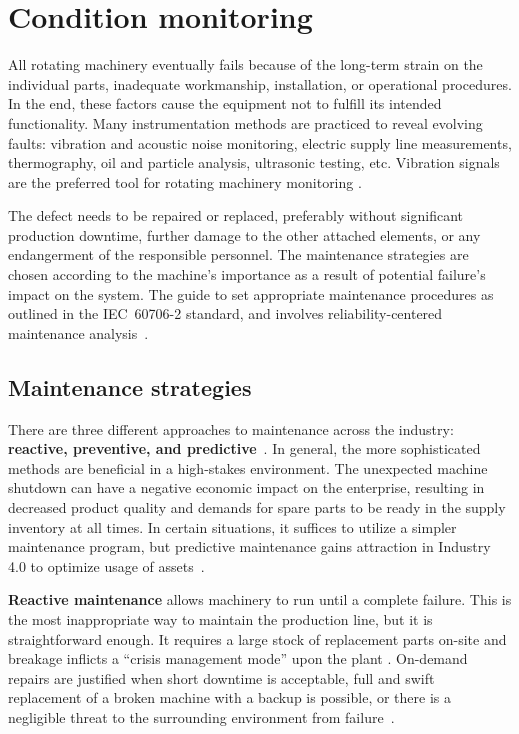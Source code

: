 \section{Condition monitoring} \label{section:condition-monitoring}
All rotating machinery eventually fails because of the long-term strain on the individual parts, inadequate workmanship, installation, or operational procedures. In the end, these factors cause the equipment not to fulfill its intended functionality. Many instrumentation methods are practiced to reveal evolving faults: vibration and acoustic noise monitoring, electric supply line measurements, thermography, oil and particle analysis, ultrasonic testing, etc. Vibration signals are the preferred tool for rotating machinery monitoring \cite{mohanty_machinery_2015}.

The defect needs to be repaired or replaced, preferably without significant production downtime, further damage to the other attached elements, or any endangerment of the responsible personnel. The maintenance strategies are chosen according to the machine's importance as a result of potential failure's impact on the system. The guide to set appropriate maintenance procedures as outlined in the IEC~60706-2 standard, and involves reliability-centered maintenance analysis~\cite{el-thalji_predictive_2019}.

\subsection{Maintenance strategies}
There are three different approaches to maintenance across the industry: \textbf{reactive, preventive, and predictive}~\cite{scheffer_practical_2004}. In general, the more sophisticated methods are beneficial in a high-stakes environment. The unexpected machine shutdown can have a negative economic impact on the enterprise, resulting in decreased product quality and demands for spare parts to be ready in the supply inventory at all times. In certain situations, it suffices to utilize a simpler maintenance program, but predictive maintenance gains attraction in Industry 4.0 to optimize usage of assets~\cite{cinar_machine_2020}.

\textbf{Reactive maintenance} allows machinery to run until a complete failure. This is the most inappropriate way to maintain the production line, but it is straightforward enough. It requires a large stock of replacement parts on-site and breakage inflicts a ``crisis management mode'' upon the plant \cite{scheffer_practical_2004}. On-demand repairs are justified when short downtime is acceptable, full and swift replacement of a broken machine with a backup is possible, or there is a negligible threat to the surrounding environment from failure~\cite{ziaran_technicka_2013}.

